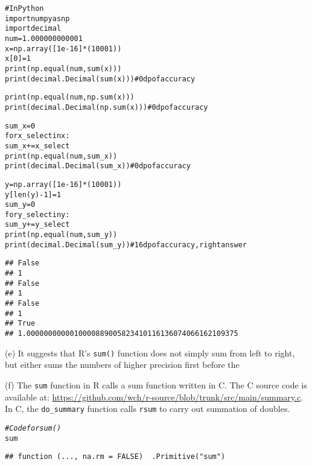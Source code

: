 \documentclass{article}\usepackage[]{graphicx}\usepackage[]{color}
\makeatletter
\newcommand{\hlcom}[1]{\textcolor[rgb]{0.678,0.584,0.686}{\textit{#1}}}%
\newcommand{\hlstd}[1]{\textcolor[rgb]{0.345,0.345,0.345}{#1}}%
\newenvironment{kframe}{%
 \def\at@end@of@kframe{}%
 \ifinner\ifhmode%
  \def\at@end@of@kframe{\end{minipage}}%
  \begin{minipage}{\columnwidth}%
 \fi\fi%
 \def\FrameCommand##1{\hskip\@totalleftmargin \hskip-\fboxsep
 \colorbox{shadecolor}{##1}\hskip-\fboxsep
     \hskip-\linewidth \hskip-\@totalleftmargin \hskip\columnwidth}%
 \MakeFramed {\advance\hsize-\width
   \@totalleftmargin\z@ \linewidth\hsize
   \@setminipage}}%
 {\par\unskip\endMakeFramed%
 \at@end@of@kframe}
\newenvironment{knitrout}{}{} %
\makeatother
\begin{document}
\begin{knitrout}
\color{fgcolor}\begin{kframe}
\begin{alltt}
# In Python
import numpy as np
import decimal
num = 1.000000000001
x = np.array([1e-16]*(10001))
x[0] = 1
print(np.equal(num, sum(x)))
print(decimal.Decimal(sum(x))) # 0 dp of accuracy

print(np.equal(num, np.sum(x)))
print(decimal.Decimal(np.sum(x))) # 0 dp of accuracy

sum_x = 0
for x_select in x:
  sum_x += x_select
print(np.equal(num, sum_x))
print(decimal.Decimal(sum_x)) # 0 dp of accuracy

y = np.array([1e-16]*(10001))
y[len(y)-1] = 1
sum_y = 0
for y_select in y:
  sum_y += y_select
print(np.equal(num, sum_y))
print(decimal.Decimal(sum_y)) # 16 dp of accuracy, right answer
\end{alltt}

\begin{verbatim}
## False
## 1
## False
## 1
## False
## 1
## True
## 1.0000000000010000889005823410116136074066162109375
\end{verbatim}
\end{kframe}
\end{knitrout}

(e) It suggests that R's \texttt{sum()} function does not simply sum from left to right, but either sums the numbers of higher precision first before the 

(f) The \texttt{sum} function in R calls a sum function written in C. The C source code is available at: \url{https://github.com/wch/r-source/blob/trunk/src/main/summary.c}. In C, the \texttt{do\_summary} function calls \texttt{rsum} to carry out summation of doubles.

\begin{knitrout}
\color{fgcolor}\begin{kframe}
\begin{alltt}
\hlcom{# Code for sum()}
\hlstd{sum}
\end{alltt}
\begin{verbatim}
## function (..., na.rm = FALSE)  .Primitive("sum")
\end{verbatim}
\end{kframe}
\end{knitrout}
\end{document}

